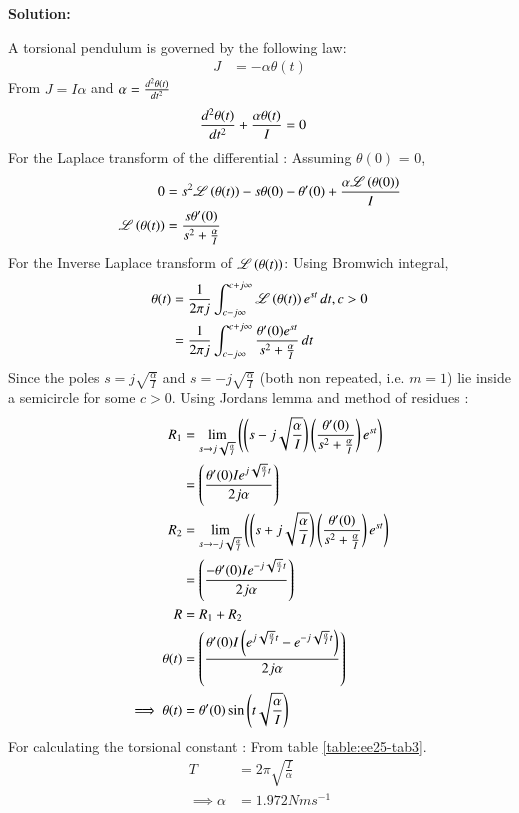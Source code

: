\documentclass[journal,12pt,onecolumn]{IEEEtran}
\theoremstyle{remark}
\begin{document}
\textbf{Solution:}
    
A torsional pendulum is governed by the following law:
\begin{align}
    J &= -\alpha\theta(t) 
\end{align}
From $J = I\alpha$ and $\alpha = \dv[2]{\theta(t)}{t}$
\begin{align}
\dv[2]{\theta(t)}{t} + \frac{\alpha\theta(t)}{I} &= 0
\end{align}
For the Laplace transform of the differential : 
Assuming $\theta(0)$ = 0,
\begin{align}
0 &= s^2\mathscr{L}\left(\theta(t)\right) - s\theta(0) - \theta'(0) + \frac{\alpha\mathscr{L}\left(\theta(0)\right)}{I}\\
\mathscr{L}\left(\theta(t)\right) &= \frac{s\theta'(0)}{s^2+\frac{\alpha}{I}}
    \end{align}
For the Inverse Laplace transform of $\mathscr{L}\left(\theta(t)\right)$: Using Bromwich integral,
\begin{align}
 \theta(t) &= \frac{1}{2\pi j}\int_{c-j\infty}^{c+j\infty}\mathscr{L}\left(\theta(t)\right)e^{st}\,dt , c > 0\\
 &= \frac{1}{2\pi j}\int_{c-j\infty}^{c+j\infty}\frac{\theta'(0)e^{st}}{s^2+\frac{\alpha}{I}}\,dt
\end{align}
Since the poles $s=j\sqrt{\frac{\alpha}{I}}$ and $s=-j\sqrt{\frac{\alpha}{I}}$ (both non repeated, i.e. $m=1$) lie inside a semicircle for some $c>0$. Using Jordans lemma and method of residues :
\begin{align}
      R_1&=\lim\limits_{s\to j\sqrt{\frac{\alpha}{I}}}\left({\left(s-j\sqrt{\frac{\alpha}{I}}\right)}\left(\frac{\theta'(0)}{s^2+\frac{\alpha}{I}}\right) e^{st}\right)\\
&={\left(\frac{\theta'(0)Ie^{j\sqrt{\frac{\alpha}{I}}t}}{2j\alpha}\right)}\\
  R_2&=\lim\limits_{s\to -j\sqrt{\frac{\alpha}{I}}}\left({\left(s+j\sqrt{\frac{\alpha}{I}}\right)}\left(\frac{\theta'(0)}{s^2+\frac{\alpha}{I}}\right) e^{st}\right)\\
&={\left(\frac{-\theta'(0)Ie^{-j\sqrt{\frac{\alpha}{I}}t}}{2j\alpha}\right)}\\
R &= R_1 + R_2\\
\theta(t) &= {\left(\frac{\theta'(0)I\left(e^{j\sqrt{\frac{\alpha}{I}}t}-e^{-j\sqrt{\frac{\alpha}{I}}t}\right)}{2j\alpha}\right)}\\
\implies
\theta(t) &=\theta'(0)\sin{\ensuremath{\left(t\sqrt{\frac{\alpha}{I}}\right)}}
\end{align}
For calculating the torsional constant :
From table \ref{table:ee25-tab3}.
\begin{align}
 T &= 2\pi\sqrt{\frac{I}{\alpha}}\\
\implies \alpha &= 1.972 Nms^{-1}
\end{align}
\end{document}
